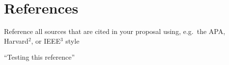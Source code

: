 \section{References}

Reference all sources that are cited in your proposal using, e.g.\ the APA, Harvard$^{2}$, or IEEE$^{3}$ style

``Testing this reference'' \citep{website:blog.helium.com}
